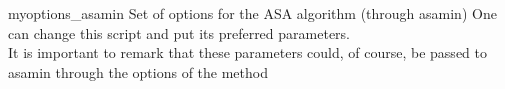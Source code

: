 \begin{command}{myoptions\_asamin}
Set of options for the ASA algorithm (through asamin)
One can change this script and put its preferred parameters.\\
It is important to remark that these parameters could, of course,
be passed to asamin through the options of the
 method
\end{command}


